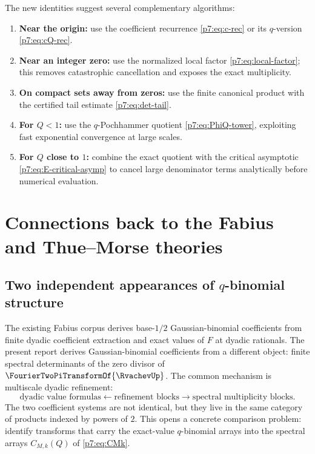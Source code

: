 \documentclass[11pt]{article}
\numberwithin{equation}{section}
\theoremstyle{definition}
\theoremstyle{remark}
\begin{document}
The new identities suggest several complementary algorithms:
\begin{enumerate}[label=(\alph*),leftmargin=2em]
\item \textbf{Near the origin:} use the coefficient recurrence \cref{p7:eq:c-rec} or its $q$-version \cref{p7:eq:cQ-rec}.
\item \textbf{Near an integer zero:} use the normalized local factor \cref{p7:eq:local-factor}; this removes catastrophic cancellation and exposes the exact multiplicity.
\item \textbf{On compact sets away from zeros:} use the finite canonical product with the certified tail estimate \cref{p7:eq:det-tail}.
\item \textbf{For $Q<1$:} use the $q$-Pochhammer quotient \cref{p7:eq:PhiQ-tower}, exploiting fast exponential convergence at large scales.
\item \textbf{For $Q$ close to $1$:} combine the exact quotient with the critical asymptotic \cref{p7:eq:E-critical-asymp} to cancel large denominator terms analytically before numerical evaluation.
\end{enumerate}

\section{Connections back to the Fabius and Thue--Morse theories}

\subsection{Two independent appearances of $q$-binomial structure}

The existing Fabius corpus derives base-$1/2$ Gaussian-binomial coefficients from finite dyadic coefficient extraction and exact values of $F$ at dyadic rationals.  The present report derives Gaussian-binomial coefficients from a different object: finite spectral determinants of the zero divisor of $\FourierTwoPiTransformOf{\RvachevUp}$.  The common mechanism is multiscale dyadic refinement:
\[
 \text{dyadic value formulas}
 \longleftarrow \text{refinement blocks}
 \longrightarrow \text{spectral multiplicity blocks}.
\]
The two coefficient systems are not identical, but they live in the same category of products indexed by powers of $2$.  This opens a concrete comparison problem: identify transforms that carry the exact-value $q$-binomial arrays into the spectral arrays $C_{M,k}(Q)$ of \cref{p7:eq:CMk}.
\end{document}
